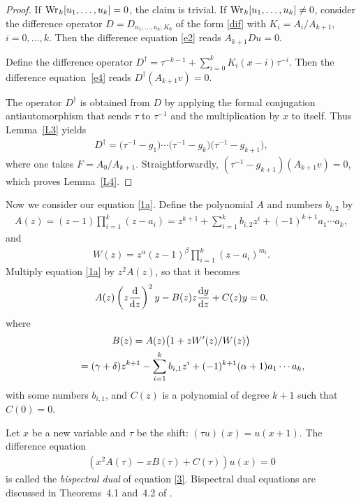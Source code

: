 \documentclass[pdftex]{sigma}
\numberwithin{equation}{section}
\def\lc{,\allowbreak\ldots,\allowbreak}
\def\Wr{\mathop{\mathrm{Wr\vrule height0pt width.6pt}}\nolimits}
\begin{document}
\begin{proof} If $\Wr_k[u_1\lc u_k]=0$, the claim is trivial. If $\Wr_k[u_1\lc u_k]\ne 0$, consider the difference operator $D=D_{u_1\lc u_k; K_0}$ of the form \eqref{dif} with $K_i=A_i/A_{k+1}$, $i=0\lc k$. Then the difference equation \eqref{e2} reads $A_{k+1} Du=0$.

Define the difference operator $D^\dag=\tau^{-k-1}+\sum\limits_{i=0}^kK_i(x-i) \tau^{-i}$. Then the difference equa\-tion~\eqref{e4} reads $D^\dag(A_{k+1}v)=0$.

The operator $D^\dag$ is obtained from $D$ by applying the formal conjugation antiautomorphism that sends $\tau$ to $\tau^{-1}$ and the multiplication by $x$ to itself. Thus Lemma~\ref{L3} yields
\begin{gather*}
D^\dag= \big(\tau^{-1}-g_1\big) \cdots \big(\tau^{-1}-g_k\big) \big(\tau^{-1}-g_{k+1}\big),
\end{gather*}
where one takes $F=A_0/A_{k+1}$. Straightforwardly, $(\tau^{-1}-g_{k+1}) (A_{k+1}v)=0$, which proves Lemma~\ref{L4}.
 \end{proof}

Now we consider our equation \eqref{1a}. Define the polynomial $A$ and numbers $b_{i,2}$ by
\begin{gather}\label{A}
A(z)=(z-1)\prod_{i=1}^k(z-a_i)= z^{k+1}+\sum_{i=1}^k b_{i,2}z^i+(-1)^{k+1}a_1\cdots a_k,
\end{gather}
and
\begin{gather*}
W(z)=z^\alpha(z-1)^\beta\prod_{i=1}^k(z-a_i)^{m_i}.
\end{gather*}
Multiply equation \eqref{1a} by $z^2A(z)$, so that it becomes
\begin{gather}
A(z) \left(z\frac{{\rm d}}{{\rm d}z}\right)^{ 2}y-B(z) z\frac{{\rm d}y}{{\rm d}z}+C(z)y=0,\label{3}
\end{gather}
where
\begin{gather}%
B(z) = A(z)\bigl(1+zW'(z)/W(z)\bigr)\nonumber\\
\hphantom{B(z)}{} = (\gamma+\delta)z^{k+1}-\sum_{i=1}^k b_{i,1}z^i+(-1)^{k+1}(\alpha+1) a_1\cdots a_k,\label{B2}
\end{gather}
with some numbers $b_{i,1}$, and $C(z)$ is a polynomial of degree $k+1$ such that $C(0)=0$.

Let $x$ be a new variable and $\tau$ be the shift: $(\tau u)(x)=u(x+1)$. The difference equation
\begin{gather}
\left(x^2A(\tau)-xB(\tau)+C(\tau)\right) u(x)=0\label{4}
\end{gather}
is called the {\it bispectral dual} of equation \eqref{3}. Bispectral dual equations are discussed in Theorems~4.1 and~4.2 of \cite{MTV}.
\end{document}
